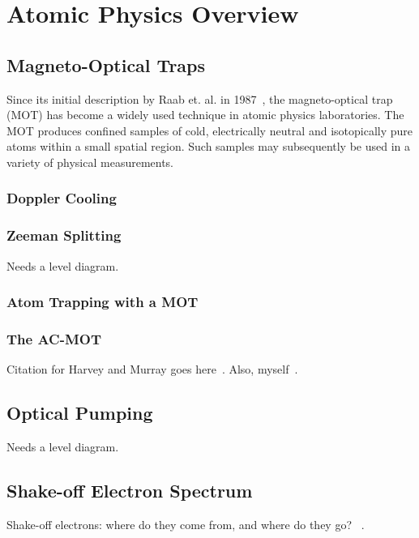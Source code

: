 %
%
%
\clearpage
\chapter{Atomic Physics Overview}
\label{atomicphysics_chapter}
\section{Magneto-Optical Traps}
Since its initial description by Raab et. al. in 1987~\cite{raabprentiss}, the magneto-optical trap (MOT) has become a widely used technique in atomic physics laboratories.  The MOT produces confined samples of cold, electrically neutral and isotopically pure atoms within a small spatial region.  Such samples may subsequently be used in a variety of physical measurements.


	\subsection{Doppler Cooling}
	\subsection{Zeeman Splitting}
	Needs a level diagram.
	\subsection{Atom Trapping with a MOT}
	\subsection{The AC-MOT}
	Citation for Harvey and Murray goes here~\cite{harveymurray}.  Also, myself~\cite{thesis}.

\section{Optical Pumping}
Needs a level diagram.


\section{Shake-off Electron Spectrum}
Shake-off electrons:  where do they come from, and where do they go?  ~\cite{Levinger}.

